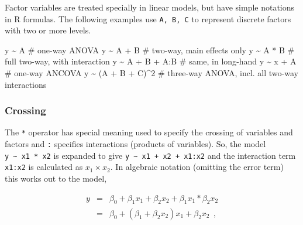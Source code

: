 \documentclass[
  letterpaper,
  10pt,
  krantz2]{krantz}
\makeatletter
\newenvironment{Shaded}{\begin{snugshade}}{\end{snugshade}}
\newcommand{\CommentTok}[1]{\textcolor[rgb]{0.37,0.37,0.37}{#1}}
\newcommand{\DecValTok}[1]{\textcolor[rgb]{0.68,0.00,0.00}{#1}}
\newcommand{\NormalTok}[1]{\textcolor[rgb]{0.00,0.23,0.31}{#1}}
\newcommand{\SpecialCharTok}[1]{\textcolor[rgb]{0.37,0.37,0.37}{#1}}
\newenvironment{kframe}{%
  \medskip{}
  \setlength{\fboxsep}{.8em}
  \def\at@end@of@kframe{}%
  \ifinner\ifhmode%
  \def\at@end@of@kframe{\end{minipage}}%
  \begin{minipage}{\columnwidth}%
  \fi\fi%
  \def\FrameCommand##1{\hskip\@totalleftmargin \hskip-\fboxsep
  \colorbox{shadecolor}{##1}\hskip-\fboxsep
      \hskip-\linewidth \hskip-\@totalleftmargin \hskip\columnwidth}%
  \MakeFramed {\advance\hsize-\width
    \@totalleftmargin\z@ \linewidth\hsize
    \@setminipage}}%
{\par\unskip\endMakeFramed%
  \at@end@of@kframe}
\renewenvironment{Shaded}{\begin{kframe}}{\end{kframe}}
\makeatother
\begin{document}
Factor variables are treated specially in linear models, but have simple
notations in R formulas. The following examples use \texttt{A,\ B,\ C}
to represent discrete factors with two or more levels.

\begin{Shaded}
\begin{Highlighting}[]
\NormalTok{y }\SpecialCharTok{\textasciitilde{}}\NormalTok{ A                 }\CommentTok{\# one{-}way ANOVA}
\NormalTok{y }\SpecialCharTok{\textasciitilde{}}\NormalTok{ A }\SpecialCharTok{+}\NormalTok{ B             }\CommentTok{\# two{-}way, main effects only}
\NormalTok{y }\SpecialCharTok{\textasciitilde{}}\NormalTok{ A }\SpecialCharTok{*}\NormalTok{ B             }\CommentTok{\# full two{-}way, with interaction}
\NormalTok{y }\SpecialCharTok{\textasciitilde{}}\NormalTok{ A }\SpecialCharTok{+}\NormalTok{ B }\SpecialCharTok{+}\NormalTok{ A}\SpecialCharTok{:}\NormalTok{B       }\CommentTok{\# same, in long{-}hand}
\NormalTok{y }\SpecialCharTok{\textasciitilde{}}\NormalTok{ x }\SpecialCharTok{+}\NormalTok{ A             }\CommentTok{\# one{-}way ANCOVA}
\NormalTok{y }\SpecialCharTok{\textasciitilde{}}\NormalTok{ (A }\SpecialCharTok{+}\NormalTok{ B }\SpecialCharTok{+}\NormalTok{ C)}\SpecialCharTok{\^{}}\DecValTok{2}     \CommentTok{\# three{-}way ANOVA, incl. all two{-}way interactions}
\end{Highlighting}
\end{Shaded}

\subsubsection{Crossing}\label{crossing}

The \texttt{*} operator has special meaning used to specify the crossing
of variables and factors and \texttt{:} specifies interactions (products
of variables). So, the model \texttt{y\ \textasciitilde{}\ x1\ *\ x2} is
expanded to give \texttt{y\ \textasciitilde{}\ x1\ +\ x2\ +\ x1:x2} and
the interaction term \texttt{x1:x2} is calculated as \(x_1 \times x_2\).
In algebraic notation (omitting the error term) this works out to the
model,

\begin{eqnarray*}
y & = & \beta_0 + \beta_1 x_1 +  \beta_2 x_2 +  \beta_1 x_1 *  \beta_2 x_2 \\
  & = & \beta_0 + (\beta_1 + \beta_2 x_2) x_1 + \beta_2 x_2 \:\: ,\\
\end{eqnarray*}
\end{document}
